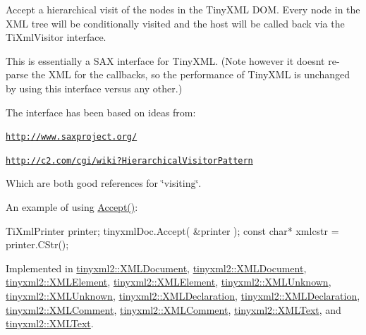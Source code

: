 Accept a hierarchical visit of the nodes in the Tiny\+X\+ML D\+OM. Every node in the X\+ML tree will be conditionally visited and the host will be called back via the Ti\+Xml\+Visitor interface.

This is essentially a S\+AX interface for Tiny\+X\+ML. (Note however it doesn\textquotesingle{}t re-\/parse the X\+ML for the callbacks, so the performance of Tiny\+X\+ML is unchanged by using this interface versus any other.)

The interface has been based on ideas from\+:


\begin{DoxyItemize}
\item \href{http://www.saxproject.org/}{\tt http\+://www.\+saxproject.\+org/}
\item \href{http://c2.com/cgi/wiki?HierarchicalVisitorPattern}{\tt http\+://c2.\+com/cgi/wiki?\+Hierarchical\+Visitor\+Pattern}
\end{DoxyItemize}

Which are both good references for \char`\"{}visiting\char`\"{}.

An example of using \hyperlink{classtinyxml2_1_1XMLNode_a81e66df0a44c67a7af17f3b77a152785}{Accept()}\+: \begin{DoxyVerb}TiXmlPrinter printer;
tinyxmlDoc.Accept( &printer );
const char* xmlcstr = printer.CStr();
\end{DoxyVerb}
 

Implemented in \hyperlink{classtinyxml2_1_1XMLDocument_a9efa54f7ecb37c17ab1fa2b3078ccca1}{tinyxml2\+::\+X\+M\+L\+Document}, \hyperlink{classtinyxml2_1_1XMLDocument_ab7be651917a35ab1ff0e4e6d4e565cdf}{tinyxml2\+::\+X\+M\+L\+Document}, \hyperlink{classtinyxml2_1_1XMLElement_a3ea8a40e788fb9ad876c28a32932c6d5}{tinyxml2\+::\+X\+M\+L\+Element}, \hyperlink{classtinyxml2_1_1XMLElement_a9b2119831e8b85827d5d3e5076788e4a}{tinyxml2\+::\+X\+M\+L\+Element}, \hyperlink{classtinyxml2_1_1XMLUnknown_a70983aa1b1cff3d3aa6d4d0a80e5ee48}{tinyxml2\+::\+X\+M\+L\+Unknown}, \hyperlink{classtinyxml2_1_1XMLUnknown_a8a06b8c82117ca969a432e17a46830fc}{tinyxml2\+::\+X\+M\+L\+Unknown}, \hyperlink{classtinyxml2_1_1XMLDeclaration_a5f376019fb34752eb248548f42f32045}{tinyxml2\+::\+X\+M\+L\+Declaration}, \hyperlink{classtinyxml2_1_1XMLDeclaration_acf47629d9fc08ed6f1c164a97bcf794b}{tinyxml2\+::\+X\+M\+L\+Declaration}, \hyperlink{classtinyxml2_1_1XMLComment_a4a33dc32fae0285b03f9cfcb3e43e122}{tinyxml2\+::\+X\+M\+L\+Comment}, \hyperlink{classtinyxml2_1_1XMLComment_a27b37d16cea01b5329dfbbb4f9508e39}{tinyxml2\+::\+X\+M\+L\+Comment}, \hyperlink{classtinyxml2_1_1XMLText_a1b2c1448f1a21299d0a7913f18b55206}{tinyxml2\+::\+X\+M\+L\+Text}, and \hyperlink{classtinyxml2_1_1XMLText_a537c60d7e18fb59c45ac2737a29ac47a}{tinyxml2\+::\+X\+M\+L\+Text}.

